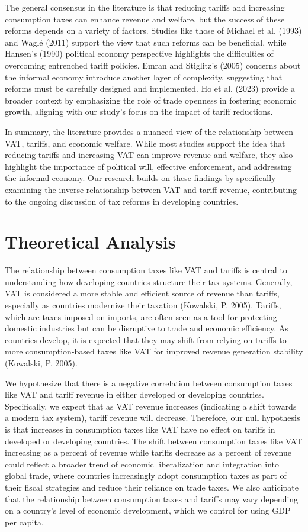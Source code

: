 \documentclass[12pt]{article}
\begin{document}
The general consensus in the literature is that reducing tariffs and increasing consumption taxes can enhance revenue and welfare, but the success of these reforms depends on a variety of factors. Studies like those of Michael et al. (1993) and Waglé (2011) support the view that such reforms can be beneficial, while Hansen’s (1990) political economy perspective highlights the difficulties of overcoming entrenched tariff policies. Emran and Stiglitz’s (2005) concerns about the informal economy introduce another layer of complexity, suggesting that reforms must be carefully designed and implemented. Ho et al. (2023) provide a broader context by emphasizing the role of trade openness in fostering economic growth, aligning with our study’s focus on the impact of tariff reductions.

In summary, the literature provides a nuanced view of the relationship between VAT, tariffs, and economic welfare. While most studies support the idea that reducing tariffs and increasing VAT can improve revenue and welfare, they also highlight the importance of political will, effective enforcement, and addressing the informal economy. Our research builds on these findings by specifically examining the inverse relationship between VAT and tariff revenue, contributing to the ongoing discussion of tax reforms in developing countries.

\section{Theoretical Analysis}
\label{sec:theory}
The relationship between consumption taxes like VAT and tariffs is central to understanding how developing countries structure their tax systems. Generally, VAT is considered a more stable and efficient source of revenue than tariffs, especially as countries modernize their taxation (Kowalski, P. 2005). Tariffs, which are taxes imposed on imports, are often seen as a tool for protecting domestic industries but can be disruptive to trade and economic efficiency. As countries develop, it is expected that they may shift from relying on tariffs to more consumption-based taxes like VAT for improved revenue generation stability (Kowalski, P. 2005).

We hypothesize that there is a negative correlation between consumption taxes like VAT and tariff revenue in either developed or developing countries. Specifically, we expect that as VAT revenue increases (indicating a shift towards a modern tax system), tariff revenue will decrease. Therefore, our null hypothesis is that increases in consumption taxes like VAT have no effect on tariffs in developed or developing countries. 
The shift between consumption taxes like VAT increasing as a percent of revenue while tariffs decrease as a percent of revenue could reflect a broader trend of economic liberalization and integration into global trade, where countries increasingly adopt consumption taxes as part of their fiscal strategies and reduce their reliance on trade taxes. We also anticipate that the relationship between consumption taxes and tariffs may vary depending on a country's level of economic development, which we control for using GDP per capita.
\end{document}
